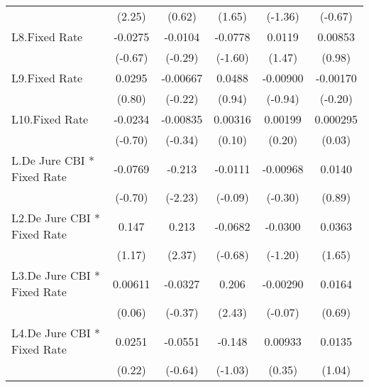 \begin{table}[htbp]
\begin{tabular}{l*{5}{c}}
                                        &   (2.25)         &   (0.62)         &   (1.65)         &  (-1.36)         &  (-0.67)         \\
\addlinespace
L8.Fixed Rate                           &  -0.0275         &  -0.0104         &  -0.0778         &   0.0119         &  0.00853         \\
                                        &  (-0.67)         &  (-0.29)         &  (-1.60)         &   (1.47)         &   (0.98)         \\
\addlinespace
L9.Fixed Rate                           &   0.0295         & -0.00667         &   0.0488         & -0.00900         & -0.00170         \\
                                        &   (0.80)         &  (-0.22)         &   (0.94)         &  (-0.94)         &  (-0.20)         \\
\addlinespace
L10.Fixed Rate                          &  -0.0234         & -0.00835         &  0.00316         &  0.00199         & 0.000295         \\
                                        &  (-0.70)         &  (-0.34)         &   (0.10)         &   (0.20)         &   (0.03)         \\
\addlinespace
L.De Jure CBI * Fixed Rate              &  -0.0769         &   -0.213\sym{*}  &  -0.0111         & -0.00968         &   0.0140         \\
                                        &  (-0.70)         &  (-2.23)         &  (-0.09)         &  (-0.30)         &   (0.89)         \\
\addlinespace
L2.De Jure CBI * Fixed Rate             &    0.147         &    0.213\sym{*}  &  -0.0682         &  -0.0300         &   0.0363         \\
                                        &   (1.17)         &   (2.37)         &  (-0.68)         &  (-1.20)         &   (1.65)         \\
\addlinespace
L3.De Jure CBI * Fixed Rate             &  0.00611         &  -0.0327         &    0.206\sym{*}  & -0.00290         &   0.0164         \\
                                        &   (0.06)         &  (-0.37)         &   (2.43)         &  (-0.07)         &   (0.69)         \\
\addlinespace
L4.De Jure CBI * Fixed Rate             &   0.0251         &  -0.0551         &   -0.148         &  0.00933         &   0.0135         \\
                                        &   (0.22)         &  (-0.64)         &  (-1.03)         &   (0.35)         &   (1.04)         \\

\end{tabular}
\end{table}
